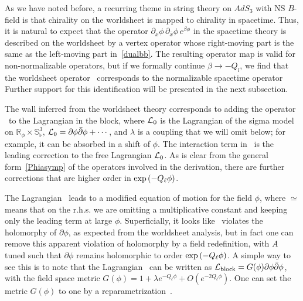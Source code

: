 \documentclass[12pt]{article}
\def\sqsphere{{\bS^3_\flat}}
\def\LL{{\mathcal{L}}}
\newcommand{\bR}{{\mathbb R}}
\newcommand{\bS}{{\mathbb S}}
\numberwithin{equation}{section}
\def\LL{{\cal L}}
\def\exp{{\rm exp}}
\begin{document}
As we have noted before, a recurring theme in string theory on $AdS_3$ with NS $B$-field is that chirality on the worldsheet is mapped to chirality in spacetime. Thus, it is natural to expect that the operator $\partial_x\phi\,\partial_{\bar x}\phi\, e^{\beta\phi}$ in the spacetime theory is described on the worldsheet by a vertex operator whose right-moving part is the same as the left-moving part in~\eqref{dualbb}. The resulting operator map is valid for non-normalizable operators, but if we formally continue $\beta\to -Q_l$, we find that the worldsheet operator \holoviol\ corresponds to the normalizable spacetime operator 
Further support for this identification will be presented in the next subsection.

The wall inferred from the worldsheet theory corresponds to adding the operator 
\ddbarphiRHS\ to the Lagrangian in the block,
\eqn[Lblock]{
\LL_{\rm block}=\LL_0+\lambda\,\partial_x\phi\,\partial_{\bar x}\phi \, e^{-Q_\ell\phi} 
}
where $\LL_0$ is the Lagrangian of the sigma model on $\bR_\phi\times\sqsphere$, $\LL_0=\partial\phi\bar\partial\phi+\cdots$, and $\lambda$ is a coupling that we will omit below; for example, it can be absorbed in a shift of $\phi$. The interaction term in \Lblock\ is the leading correction to the free Lagrangian $\LL_0$. As is clear from the general form~\eqref{Phiasymp} of the operators involved in the derivation, there are further corrections that are higher order in $\exp\left(-Q_\ell\phi\right)$. 

The Lagrangian \Lblock\ leads to a modified equation of motion for the field $\phi$, 
where $\simeq$ means that on the r.h.s. we are omitting a multiplicative constant and keeping only the leading term at large $\phi$.
Superficially, it looks like \eqnphi\ violates the holomorphy of $\partial\phi$, as expected from the worldsheet analysis, but in fact one can remove this apparent violation of holomorphy by a field redefinition,
with $A$ tuned such that $\partial\phi$ remains holomorphic to order $\exp\left(-Q_\ell\phi\right)$. A simple way to see this is to note that the Lagrangian \Lblock\ can be written as $\LL_{\rm block}=G(\phi)\partial\phi\bar\partial\phi$, with the field space metric $G(\phi)=1+\lambda e^{-Q_\ell\phi}+O\left(e^{-2Q_\ell\phi}\right)$. One can set the metric $G(\phi)$ to one by a reparametrization~\phiredef.  
\end{document}
